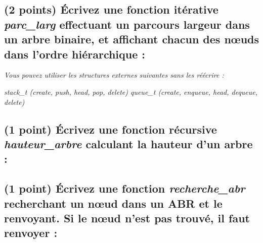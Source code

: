 \documentclass[11pt,a4paper]{article}
\begin{document}
\begin{center}
\end{center}



\clearpage


\subsection{(2 points) \'Ecrivez une fonction itérative \og \textit{parc\_larg} \fg{} effectuant un parcours largeur dans un arbre binaire, et affichant chacun des nœuds dans l'ordre hiérarchique : }



\noindent \textit{Vous pouvez utiliser les structures externes suivantes sans les réécrire :}

\noindent \textit{stack\_t (create, push, head, pop, delete) \hfill queue\_t (create, enqueue, head, dequeue, delete) }

\begin{center}
\end{center}

\clearpage


\subsection{(1 point) \'Ecrivez une fonction récursive \og \textit{hauteur\_arbre} \fg{} calculant la hauteur d'un arbre : }

\begin{center}
\end{center}

\medskip

\subsection{(1 point) \'Ecrivez une fonction \og \textit{recherche\_abr} \fg{} recherchant un nœud dans un ABR et le renvoyant. Si le nœud n'est pas trouvé, il faut renvoyer  : }
\end{document}
